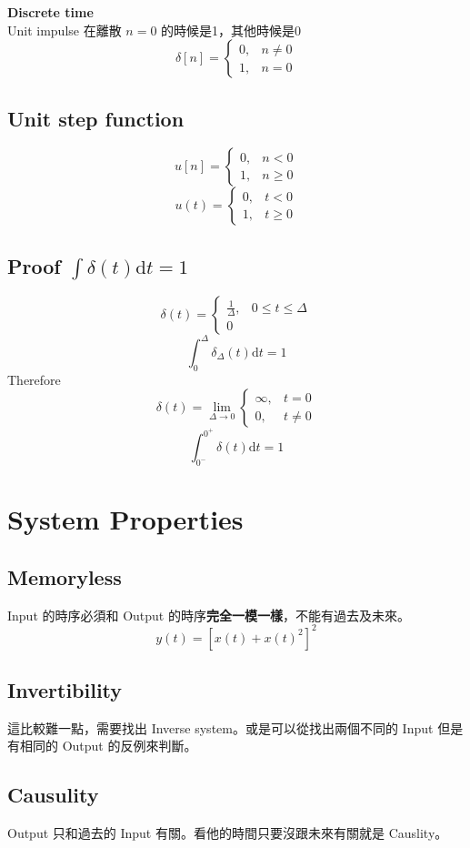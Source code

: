 \documentclass[12pt, a4paper]{article}
\begin{document}
\textbf{Discrete time} \\
Unit impulse 在離散 $n=0$ 的時候是1，其他時候是0
$$
\delta[n] = 
\begin{cases}
0, & n \ne 0 \\
1, & n = 0
\end{cases}
$$
\subsection*{Unit step function}
$$
u[n] = 
\begin{cases}
0, & n < 0 \\
1, & n \ge 0
\end{cases}
$$
$$
u(t) = 
\begin{cases}
0, & t < 0 \\
1, & t \ge 0
\end{cases}
$$
\subsection*{Proof $\int \delta(t) \text{d}t =1$}
$$
\delta(t) = 
\begin{cases}
\frac{1}{\Delta}, & 0 \le t \le \Delta \\
0
\end{cases}
$$
$$
\int_{0}^{\Delta} \delta_{\Delta}(t) \text{d}t = 1
$$
Therefore
$$
\delta(t) = \lim_{\Delta \to0}
\begin {cases}
\infty, & t = 0 \\
0, & t \ne 0
\end {cases}
$$
$$
\int_{0^-}^{0^+} \delta(t) \text{d}t = 1
$$
\newpage

\section*{System Properties}
\subsection*{Memoryless}
Input 的時序必須和 Output 的時序\textbf{完全一模一樣}，不能有過去及未來。
$$
y(t) = [x(t) + x(t)^2]^2
$$
\subsection*{Invertibility}
這比較難一點，需要找出 Inverse system。或是可以從找出兩個不同的 Input 但是有相同的 Output 的反例來判斷。
\subsection*{Causulity}
Output 只和過去的 Input 有關。看他的時間只要沒跟未來有關就是 Causlity。
\end{document}
